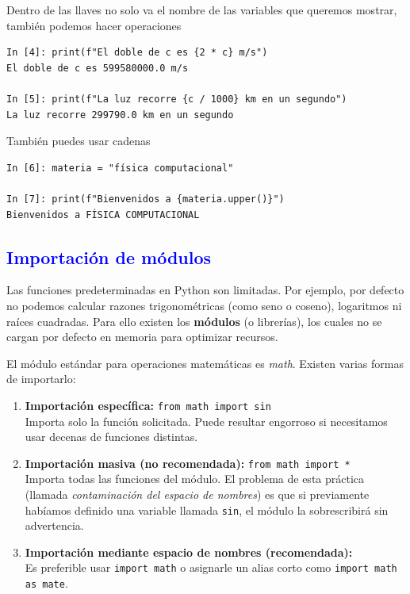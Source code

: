 \documentclass[12pt]{article}
\begin{document}
Dentro de las llaves no solo va el nombre de las variables que queremos mostrar, 
también podemos hacer operaciones 

\begin{lstlisting}
In [4]: print(f"El doble de c es {2 * c} m/s")
El doble de c es 599580000.0 m/s

In [5]: print(f"La luz recorre {c / 1000} km en un segundo")
La luz recorre 299790.0 km en un segundo
\end{lstlisting}

También puedes usar cadenas

\begin{lstlisting}
In [6]: materia = "física computacional"

In [7]: print(f"Bienvenidos a {materia.upper()}")
Bienvenidos a FÍSICA COMPUTACIONAL
\end{lstlisting}

\subsection*{\textcolor{blue}{Importación de módulos}}

Las funciones predeterminadas en Python son limitadas. Por ejemplo, por defecto no podemos 
calcular razones trigonométricas (como seno o coseno), logaritmos ni raíces cuadradas. 
Para ello existen los \textbf{módulos} (o librerías), los cuales no se cargan por defecto en 
memoria para optimizar recursos.

El módulo estándar para operaciones matemáticas es \textit{math}. Existen varias formas de importarlo:

\begin{enumerate}
    \item \textbf{Importación específica:} \lstinline|from math import sin| \\
    Importa solo la función solicitada. Puede resultar engorroso si necesitamos usar decenas 
    de funciones distintas.

    \item \textbf{Importación masiva (no recomendada):} \lstinline|from math import *| \\
    Importa todas las funciones del módulo. El problema de esta práctica 
    (llamada \textit{contaminación del espacio de nombres}) es que si previamente habíamos 
    definido una variable llamada \texttt{sin}, el módulo la sobrescribirá sin advertencia.

    \item \textbf{Importación mediante espacio de nombres (recomendada):} \\
    Es preferible usar \lstinline|import math| o asignarle un alias corto como 
    \lstinline|import math as mate|.
\end{enumerate}
\end{document}
